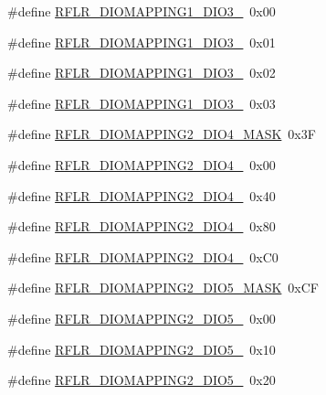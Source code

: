 \begin{DoxyCompactItemize}
\item 
\#define \mbox{\hyperlink{sx1276_regs-_lo_ra_8h_a551ae1e5f5fca17d8b1866ef33d8c625}{R\+F\+L\+R\+\_\+\+D\+I\+O\+M\+A\+P\+P\+I\+N\+G1\+\_\+\+D\+I\+O3\+\_}}~0x00
\item 
\#define \mbox{\hyperlink{sx1276_regs-_lo_ra_8h_a2017ab5d8218e6ec01f7bc8c530dab36}{R\+F\+L\+R\+\_\+\+D\+I\+O\+M\+A\+P\+P\+I\+N\+G1\+\_\+\+D\+I\+O3\+\_}}~0x01
\item 
\#define \mbox{\hyperlink{sx1276_regs-_lo_ra_8h_ad8f51698cfb8f6f58a6f29735d27807b}{R\+F\+L\+R\+\_\+\+D\+I\+O\+M\+A\+P\+P\+I\+N\+G1\+\_\+\+D\+I\+O3\+\_}}~0x02
\item 
\#define \mbox{\hyperlink{sx1276_regs-_lo_ra_8h_abfb68e4b1ca125be4fa873f9bc2a4a35}{R\+F\+L\+R\+\_\+\+D\+I\+O\+M\+A\+P\+P\+I\+N\+G1\+\_\+\+D\+I\+O3\+\_}}~0x03
\item 
\#define \mbox{\hyperlink{sx1276_regs-_lo_ra_8h_a2edc9ee9a9806b51ce98036d53023a1b}{R\+F\+L\+R\+\_\+\+D\+I\+O\+M\+A\+P\+P\+I\+N\+G2\+\_\+\+D\+I\+O4\+\_\+\+M\+A\+SK}}~0x3F
\item 
\#define \mbox{\hyperlink{sx1276_regs-_lo_ra_8h_a4411dcaba5455b537f266a64720f27ed}{R\+F\+L\+R\+\_\+\+D\+I\+O\+M\+A\+P\+P\+I\+N\+G2\+\_\+\+D\+I\+O4\+\_}}~0x00
\item 
\#define \mbox{\hyperlink{sx1276_regs-_lo_ra_8h_a1bd8087999e9680a935e194cc38d0059}{R\+F\+L\+R\+\_\+\+D\+I\+O\+M\+A\+P\+P\+I\+N\+G2\+\_\+\+D\+I\+O4\+\_}}~0x40
\item 
\#define \mbox{\hyperlink{sx1276_regs-_lo_ra_8h_a236e237046e0ad2df6fc1863faf889e8}{R\+F\+L\+R\+\_\+\+D\+I\+O\+M\+A\+P\+P\+I\+N\+G2\+\_\+\+D\+I\+O4\+\_}}~0x80
\item 
\#define \mbox{\hyperlink{sx1276_regs-_lo_ra_8h_a34a1f33c5dc2b5ccfbb23eb88449e0c4}{R\+F\+L\+R\+\_\+\+D\+I\+O\+M\+A\+P\+P\+I\+N\+G2\+\_\+\+D\+I\+O4\+\_}}~0x\+C0
\item 
\#define \mbox{\hyperlink{sx1276_regs-_lo_ra_8h_af3fc23f7884695edc293589fd947e129}{R\+F\+L\+R\+\_\+\+D\+I\+O\+M\+A\+P\+P\+I\+N\+G2\+\_\+\+D\+I\+O5\+\_\+\+M\+A\+SK}}~0x\+CF
\item 
\#define \mbox{\hyperlink{sx1276_regs-_lo_ra_8h_a0e5493d208e6868affd080d05a7d467e}{R\+F\+L\+R\+\_\+\+D\+I\+O\+M\+A\+P\+P\+I\+N\+G2\+\_\+\+D\+I\+O5\+\_}}~0x00
\item 
\#define \mbox{\hyperlink{sx1276_regs-_lo_ra_8h_aba65bbca70d5269aa6579f9511d3e7ff}{R\+F\+L\+R\+\_\+\+D\+I\+O\+M\+A\+P\+P\+I\+N\+G2\+\_\+\+D\+I\+O5\+\_}}~0x10
\item 
\#define \mbox{\hyperlink{sx1276_regs-_lo_ra_8h_a2ad3aaa57ff9cc5032a3dfa5459ee087}{R\+F\+L\+R\+\_\+\+D\+I\+O\+M\+A\+P\+P\+I\+N\+G2\+\_\+\+D\+I\+O5\+\_}}~0x20

\end{DoxyCompactItemize}
